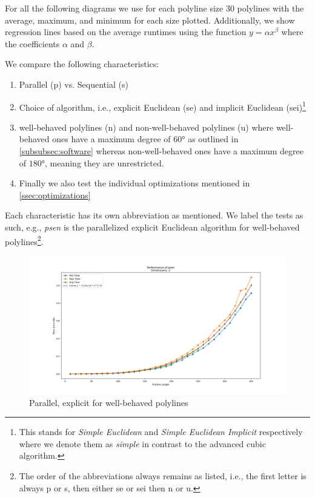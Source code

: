 For all the following diagrams we use for each polyline size 30 polylines with the average, maximum, and minimum for each size plotted. Additionally, we show regression lines based on the average runtimes using the function \(y = \alpha x^\beta\) where the coefficients \(\alpha\) and \(\beta\).

We compare the following characteristics: 
\begin{enumerate}
  \item Parallel (p) vs. Sequential (s)
  \item Choice of algorithm, i.e., explicit Euclidean (se) and implicit Euclidean (sei)\footnote{This stands for \emph{Simple Euclidean} and \emph{Simple Euclidean Implicit} respectively where we denote them as \emph{simple} in contrast to the advanced cubic algorithm.}
  \item well-behaved polylines (n) and non-well-behaved polylines (u) where well-behaved ones have a maximum degree of \(60\)° as outlined in \cref{subsubsec:software} whereas non-well-behaved ones have a maximum degree of \(180\)°, meaning they are unrestricted. 
  \item Finally we also test the individual optimizations mentioned in \cref{ssec:optimizations} %
\end{enumerate}

Each characteristic has its own abbreviation as mentioned. We label the tests as such, e.g., \emph{psen} is the parallelized explicit Euclidean algorithm for well-behaved polylines\footnote{The order of the abbreviations always remains as listed, i.e., the first letter is always p or s, then either se or sei then n or u.}.

\begin{figure}[ht]
  \centering
  \includegraphics[scale=0.5]{figures/psen.png}
  \caption{Parallel, explicit for well-behaved polylines}
  \label{fig:psen}
\end{figure}




